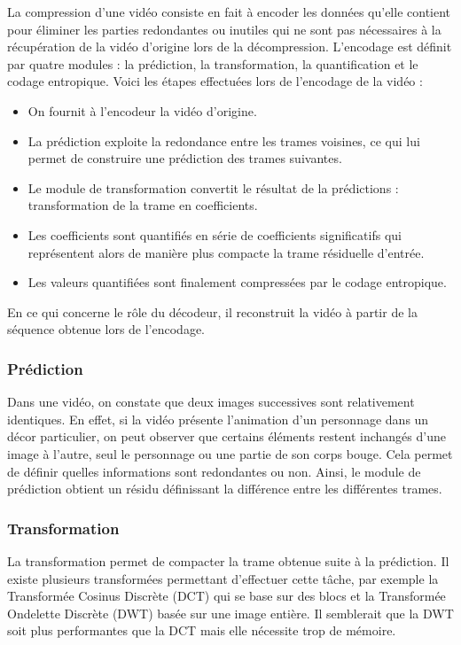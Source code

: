 \documentclass[a4paper, 11pt]{article} %
\begin{document}
La compression d'une vidéo consiste en fait à encoder les données qu'elle contient pour éliminer les parties redondantes ou inutiles qui ne sont pas nécessaires à la récupération de la vidéo d'origine lors de la décompression. L'encodage est définit par quatre modules : la prédiction, la transformation, la quantification et le codage entropique. Voici les étapes effectuées lors de l'encodage de la vidéo \cite{compression:video} :

\begin{itemize}
  \item On fournit à l'encodeur la vidéo d'origine.
	\item La prédiction exploite la redondance entre les trames voisines, ce qui lui permet de construire une prédiction des trames suivantes.
	\item Le module de transformation convertit le résultat de la prédictions : transformation de la trame en coefficients.
	\item Les coefficients sont quantifiés en série de coefficients significatifs qui représentent alors de manière plus compacte la trame résiduelle d'entrée.
	\item Les valeurs quantifiées sont finalement compressées par le codage entropique.
\end{itemize}

En ce qui concerne le rôle du décodeur, il reconstruit la vidéo à partir de la séquence obtenue lors de l'encodage.

\subsubsection{Prédiction}
Dans une vidéo, on constate que deux images successives sont relativement identiques. En effet, si la vidéo présente l'animation d'un personnage dans un décor particulier, on peut observer que certains éléments restent inchangés d'une image à l'autre, seul le personnage ou une partie de son corps bouge. Cela permet de définir quelles informations sont redondantes ou non. Ainsi, le module de prédiction obtient un résidu définissant la différence entre les différentes trames.

\subsubsection{Transformation}
La transformation permet de compacter la trame obtenue suite à la prédiction. Il existe plusieurs transformées permettant d'effectuer cette tâche, par exemple la Transformée Cosinus Discrète (DCT) qui se base sur des blocs et la Transformée Ondelette Discrète (DWT) basée sur une image entière. Il semblerait que la DWT soit plus performantes que la DCT mais elle nécessite trop de mémoire.
\end{document}
